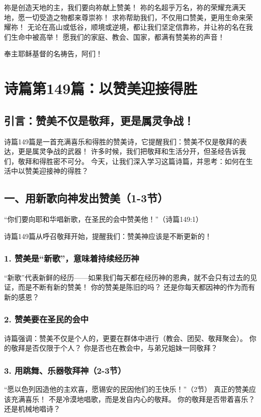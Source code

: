 \documentclass[a4paper, 12pt]{article}
\begin{document}
祢是创造天地的主，我们要向祢献上赞美！
祢的名超乎万名，祢的荣耀充满天地，愿一切受造之物都来尊崇祢！
求祢帮助我们，不仅用口赞美，更用生命来荣耀祢！
无论在高山或低谷，顺境或逆境，都让我们坚定信靠祢，并让祢的名在我们生命中被高举！
愿我们的家庭、教会、国家，都满有赞美祢的声音！

奉主耶稣基督的名祷告，阿们！
\newpage
\section{诗篇第149篇：以赞美迎接得胜}
\subsection*{引言：赞美不仅是敬拜，更是属灵争战！}
诗篇149篇是一首充满喜乐和得胜的赞美诗，它提醒我们：赞美不仅是敬拜的表达，更是属灵争战的武器！ 许多时候，我们把敬拜和生活分开，但圣经告诉我们，敬拜和得胜密不可分。
今天，让我们深入学习这篇诗篇，并思考：如何在生活中以赞美迎接神的得胜？

\subsection*{一、用新歌向神发出赞美（1-3节）}
“你们要向耶和华唱新歌，在圣民的会中赞美他！”（诗篇149:1）

诗篇149篇从呼召敬拜开始，提醒我们：赞美神应该是不断更新的！

\subsubsection*{1. 赞美是“新歌”，意味着持续经历神}
“新歌”代表新鲜的经历——如果我们每天都在经历神的恩典，就不会只有过去的见证，而是不断有新的赞美！
你的赞美是陈旧的吗？ 还是你每天都因神的作为而有新的感恩？
\subsubsection*{2. 赞美要在圣民的会中}
诗篇强调：赞美不仅是个人的，更要在群体中进行（教会、团契、敬拜聚会）。
你的敬拜是否仅限于个人？ 你是否也在教会中，与弟兄姐妹一同敬拜？
\subsubsection*{3. 用跳舞、乐器敬拜神（2-3节）}
“愿以色列因造他的主欢喜，愿锡安的民因他们的王快乐！”（2节）
真正的赞美应该充满喜乐！ 不是冷漠地唱歌，而是发自内心的敬拜。
你的敬拜是否带着喜乐？ 还是机械地唱诗？
\end{document}
